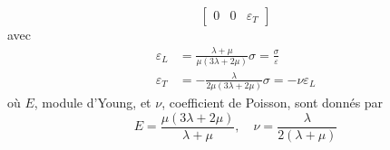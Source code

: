 \begin{enumerate}
\begin{equation}
\begin{bmatrix}
                0 & 0 & \varepsilon_T
            \end{bmatrix}
            \label{eq:Ch05-030}
        \end{equation}
        avec
        \begin{equation}
            \begin{aligned}
                \varepsilon_L &= \frac{\lambda + \mu}{\mu \left( 3 \lambda + 2 \mu \right)} \sigma = \frac{\sigma}{\varepsilon} \\
                \varepsilon_T &= -\frac{\lambda}{2\mu \left( 3 \lambda + 2 \mu \right)} \sigma = -\nu \varepsilon_L
            \end{aligned}
            \label{eq:Ch05-031}
        \end{equation}
        où $E$, module d'Young, et $\nu$, coefficient de Poisson, sont donnés par 
        \begin{equation}
            E = \frac{\mu \left( 3 \lambda + 2 \mu \right)}{\lambda + \mu}, \quad \nu = \frac{\lambda}{2 \left( \lambda + \mu \right)}
            \label{eq:Ch05-032}
        \end{equation}
\end{enumerate}

